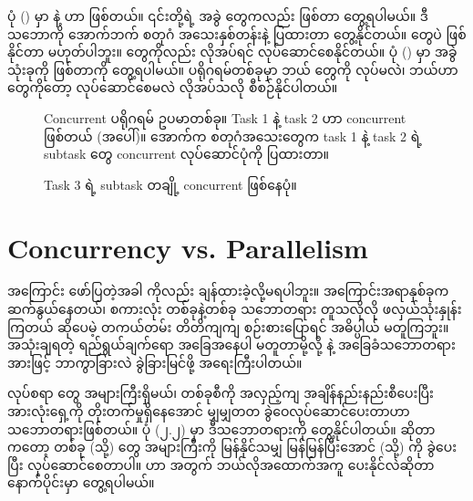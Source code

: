 ပုံ (\fRefNo{\ref{fig:concurrent1}}) မှာ  နဲ့  ဟာ  ဖြစ်တယ်။ ၎င်းတို့ရဲ့ အခွဲ  တွေကလည်း  ဖြစ်တာ တွေ့ရပါမယ်။ ဒီသဘောကို အောက်ဘက် စတုဂံ အသေးနှစ်တန်းနဲ့  ပြထားတာ တွေ့နိုင်တယ်။  တွေပဲ  ဖြစ်နိုင်တာ မဟုတ်ပါဘူး။  တွေကိုလည်း လိုအပ်ရင်  လုပ်ဆောင်စေနိုင်တယ်။ ပုံ (\fRefNo{\ref{fig:concurrent2}}) မှာ  အခွဲ  သုံးခုကို  ဖြစ်တာကို တွေ့ရပါမယ်။  ပရိုဂရမ်တစ်ခုမှာ ဘယ်  တွေကို  လုပ်မလဲ၊ ဘယ်ဟာတွေကိုတော့  လုပ်ဆောင်စေမလဲ လိုအပ်သလို စီစဉ်နိုင်ပါတယ်။ 
\begin{figure}[H]
    \caption{Concurrent ပရိုဂရမ် ဥပမာတစ်ခု။ Task 1 နဲ့ task 2 ဟာ concurrent ဖြစ်တယ် (အပေါ်)။ အောက်က စတုဂံအသေးတွေက task 1 နဲ့ task 2 ရဲ့ subtask တွေ concurrent လုပ်ဆောင်ပုံကို ပြထားတာ။}
    \label{fig:concurrent1}
\end{figure}

\begin{figure}[H]
    \caption{Task 3 ရဲ့ subtask တချို့ concurrent ဖြစ်နေပုံ။}
    \label{fig:concurrent2}
\end{figure}%
%

\clearpage
\section{Concurrency vs. Parallelism}
 အကြောင်း ဖော်ပြတဲ့အခါ  ကိုလည်း ချန်ထားခဲ့လို့မရပါဘူး။ အကြောင်းအ\allowbreak ရာနှစ်ခုက ဆက်နွယ်နေတယ်၊ စကားလုံး တစ်ခုနဲ့တစ်ခု သဘောတရား တူသလိုလို ဖလှယ်သုံးနှုန်းကြတယ် ဆိုပေမဲ့ တကယ်တမ်း တိတိကျကျ စဉ်းစားပြောရင် အဓိပ္ပါယ်  မတူကြဘူး။ အသုံးချရတဲ့ ရည်ရွယ်ချက်ရော အခြေအနေပါ မတူတာမို့လို့  နဲ့  အခြေခံသဘောတရားအားဖြင့် ဘာကွာခြားလဲ ခွဲခြားမြင်ဖို့ အရေးကြီးပါတယ်။  


လုပ်စရာ  တွေ အများကြီးရှိမယ်၊ တစ်ခုစီကို အလှည့်ကျ အချိန်နည်းနည်းစီပေးပြီး အားလုံးရှေ့ကို တိုးတက်မှုရှိနေအောင် မျှမျှတတ ခွဲဝေလုပ်ဆောင်ပေးတာဟာ  သဘောတရားဖြစ်တယ်။ ပုံ (၂.၂) မှာ ဒီသဘောတရားကို တွေ့နိုင်ပါတယ်။  ဆိုတာကတော့  တစ်ခု (သို့)  တွေ အများကြီးကို မြန်နိုင်သမျှ မြန်မြန်ပြီးအောင်  (သို့)  ကို ခွဲပေးပြီး လုပ်ဆောင်စေတာပါ။  ဟာ  အတွက် ဘယ်လိုအထောက်အကူ ပေးနိုင်လဲဆိုတာ နောက်ပိုင်းမှာ တွေ့ရပါမယ်။








